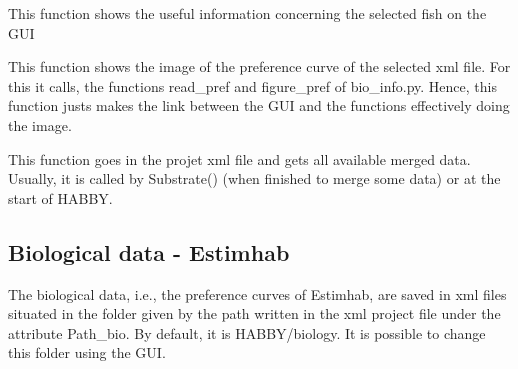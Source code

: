\documentclass[letterpaper,10pt,english]{sphinxmanual}
\begin{document}
\begin{fulllineitems}
\begin{fulllineitems}
\end{fulllineitems}


\begin{fulllineitems}
\label{\detokenize{index:src_GUI.bio_info_GUI.BioInfo.show_info_fish}}
This function shows the useful information concerning the selected fish on the GUI

\end{fulllineitems}


\begin{fulllineitems}
\label{\detokenize{index:src_GUI.bio_info_GUI.BioInfo.show_pref}}
This function shows the image of the preference curve of the selected xml file. For this it calls, the functions
read\_pref and figure\_pref of bio\_info.py. Hence, this function justs makes the link between the GUI and
the functions effectively doing the image.

\end{fulllineitems}


\begin{fulllineitems}
\label{\detokenize{index:src_GUI.bio_info_GUI.BioInfo.update_merge_list}}
This function goes in the projet xml file and gets all available merged data. Usually, it is called
by Substrate() (when finished to merge some data) or at the start of HABBY.

\end{fulllineitems}


\end{fulllineitems}



\subsection{Biological data - Estimhab}
\label{\detokenize{index:biological-data-estimhab}}
The biological data, i.e., the preference curves of Estimhab, are saved in xml files
situated in the folder given by the path written in the xml project file under the
attribute Path\_bio. By default, it is HABBY/biology. It is possible to change this folder
using the GUI.
\end{document}
